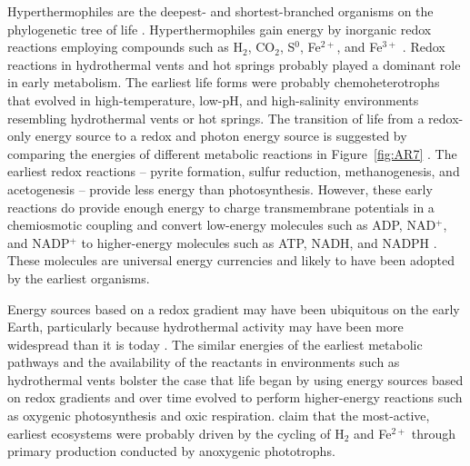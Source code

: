 Hyperthermophiles are the deepest- and shortest-branched organisms on the phylogenetic tree of life \citep[\eg][]{Pace1997, Lineweaver2003}. Hyperthermophiles gain energy by inorganic redox reactions employing compounds such as H$_{2}$, CO$_{2}$, S$^{0}$, Fe$^{2+}$, and Fe$^{3+}$ \citep{Stetter2006}. Redox reactions in hydrothermal vents and hot springs probably played a dominant role in early metabolism. The earliest life forms were probably chemoheterotrophs that evolved in high-temperature, low-pH, and high-salinity environments resembling hydrothermal vents \citep{Martin2008} or hot springs. The transition of life from a redox-only energy source to a redox and photon energy source is suggested by comparing the energies of different metabolic reactions in Figure~\ref{fig:AR7} \citep{Sleep2008}. The earliest redox reactions -- pyrite formation, sulfur reduction, methanogenesis, and acetogenesis \citep{Wachtershauser1998,Martin2007,Blank2009,Ljungdahl1986} -- provide less energy than photosynthesis. However, these early reactions do provide enough energy to charge transmembrane potentials in a chemiosmotic coupling and convert low-energy molecules such as ADP, NAD$^{+}$, and NADP$^{+}$ to higher-energy molecules such as ATP, NADH, and NADPH \citep{Mitchell1961}. These molecules are universal energy currencies and likely to have been adopted by the earliest organisms.
 
Energy sources based on a redox gradient may have been ubiquitous on the early Earth, particularly because hydrothermal activity may have been more widespread than it is today \citep{Sleep2007}. The similar energies of the earliest metabolic pathways and the availability of the reactants in environments such as hydrothermal vents bolster the case that life began by using energy sources based on redox gradients and over time evolved to perform higher-energy reactions such as oxygenic photosynthesis and oxic respiration. \citet{Canfield2006} claim that the most-active, earliest ecosystems were probably driven by the cycling of H$_{2}$ and Fe$^{2+}$ through primary production conducted by anoxygenic phototrophs.

